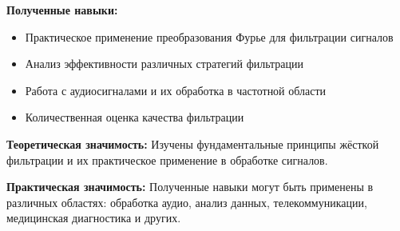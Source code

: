 \textbf{Полученные навыки:}
\begin{itemize}
    \item Практическое применение преобразования Фурье для фильтрации сигналов
    \item Анализ эффективности различных стратегий фильтрации
    \item Работа с аудиосигналами и их обработка в частотной области
    \item Количественная оценка качества фильтрации
\end{itemize}

\textbf{Теоретическая значимость:} Изучены фундаментальные принципы жёсткой фильтрации и их практическое применение в обработке сигналов.

\textbf{Практическая значимость:} Полученные навыки могут быть применены в различных областях: обработка аудио, анализ данных, телекоммуникации, медицинская диагностика и других.
